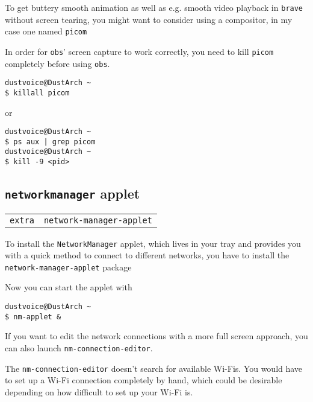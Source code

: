 \documentclass[9pt]{report}
\newenvironment{NOTE}
{\begin{tcolorbox}[colback=admonitionBG,coltitle=draculaFG,colframe=draculaBlue,colbacktitle=draculaBlue,title=NOTE]}
{\end{tcolorbox}}
\newenvironment{WARNING}
{\begin{tcolorbox}[colback=admonitionBG,coltitle=draculaBG,colframe=draculaOrange,colbacktitle=draculaOrange,title=WARNING]}
{\end{tcolorbox}}
\newenvironment{packagetable}
{\begin{longtabu}to \textwidth [b]{X[1,r]|X[1,l]}}
{\end{longtabu}}
\begin{document}
To get buttery smooth animation as well as e.g. smooth video playback in \texttt{brave} without screen tearing, you might want to consider using a compositor, in my case one named \texttt{picom}


\begin{WARNING}
    In order for \texttt{obs}' screen capture to work correctly, you need to kill \texttt{picom} completely before using \texttt{obs}.


    \begin{verbatim}
dustvoice@DustArch ~
$ killall picom
    \end{verbatim}

    or

    \begin{verbatim}
dustvoice@DustArch ~
$ ps aux | grep picom
dustvoice@DustArch ~
$ kill -9 <pid>
    \end{verbatim}
\end{WARNING}

\newpage

\hypertarget{x-networkmanager-applet}{\subsection{\texttt{networkmanager} applet}}
\begin{packagetable}
    \texttt{extra} & \texttt{network-manager-applet} \\ 
\end{packagetable}

To install the \texttt{NetworkManager} applet, which lives in your tray and provides you with a quick method to connect to different networks, you have to install the \texttt{network-manager-applet} package


Now you can start the applet with


\begin{verbatim}
dustvoice@DustArch ~
$ nm-applet &
\end{verbatim}

If you want to edit the network connections with a more full screen approach, you can also launch \texttt{nm-connection-editor}.


\begin{NOTE}
    The \texttt{nm-connection-editor} doesn’t search for available Wi-Fis.
    You would have to set up a Wi-Fi connection completely by hand, which could be desirable depending on how difficult to set up your Wi-Fi is.

\end{NOTE}
\end{document}
